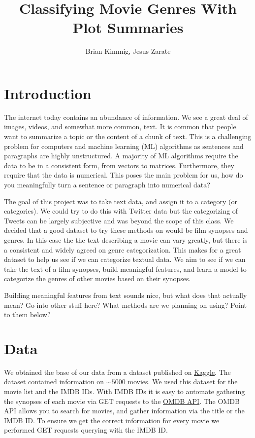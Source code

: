 \documentclass[11pt]{article}
\title{Classifying Movie Genres With Plot Summaries}
\author{Brian Kimmig, Jesus Zarate}
\date{}
\begin{document}
\maketitle

\section{Introduction}
\label{sec:introduction}

The internet today contains an abundance of information. We see a great deal of images, videos, and somewhat more common, text. It is common that people want to summarize a topic or the content of a chunk of text. This is a challenging problem for computers and machine learning (ML) algorithms as sentences and paragraphs are highly unstructured. A majority of ML algorithms require the data to be in a consistent form, from vectors to matrices. Furthermore, they require that the data is numerical. This poses the main problem for us, how do you meaningfully turn a sentence or paragraph into numerical data?

The goal of this project was to take text data, and assign it to a category (or categories). We could try to do this with Twitter data but the categorizing of Tweets can be largely subjective and was beyond the scope of this class. We decided that a good dataset to try these methods on would be film synopses and genres. In this case the the text describing a movie can vary greatly, but there is a consistent and widely agreed on genre categorization. This makes for a great dataset to help us see if we can categorize textual data. We aim to see if we can take the text of a film synopses, build meaningful features, and learn a model to categorize the genres of other movies based on their synopses. 

Building meaningful features from text sounds nice, but what does that actually mean? Go into other stuff here? What methods are we planning on using? Point to them below?
 
\section{Data}
\label{sec:data}

We obtained the base of our data from a dataset published on \href{https://www.kaggle.com/deepmatrix/imdb-5000-movie-dataset}{Kaggle}. The dataset contained information on $\sim5000$ movies. We used this dataset for the movie list and the IMDB IDs. With IMDB IDs it is easy to automate gathering the synopses of each movie via GET requests to the \href{https://www.omdbapi.com/}{OMDB API}. The OMDB API allows you to search for movies, and gather information via the title or the IMDB ID. To ensure we get the correct information for every movie we performed GET requests querying with the IMDB ID. 
\end{document}
